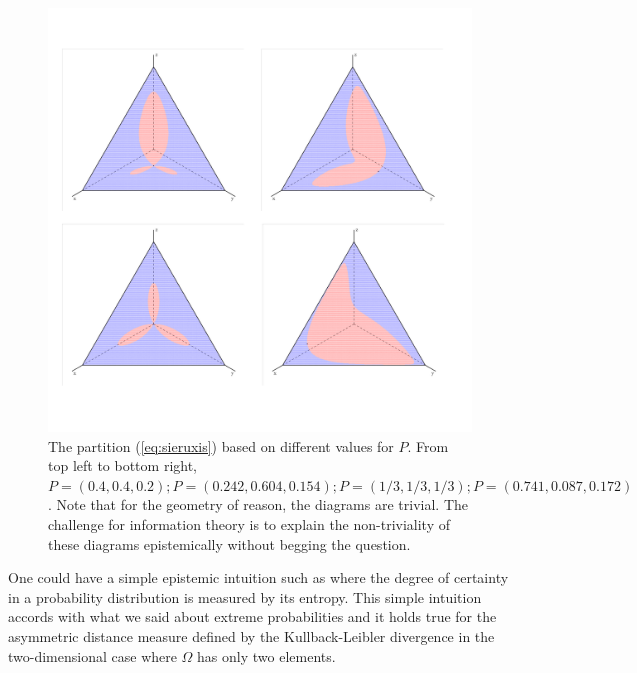 \documentclass[11pt]{article}
\begin{document}
\begin{figure}[ht]
  \begin{flushright}
    \begin{minipage}[h]{\linewidth}
      \includegraphics[width=\textwidth]{concat2.png}
      \caption{\footnotesize The partition (\ref{eq:sieruxis}) based
        on different values for $P$. From top left to bottom right,
        $P=(0.4,0.4,0.2); P=(0.242,0.604,0.154); P=(1/3,1/3,1/3);
        P=(0.741,0.087,0.172)$.
        Note that for the geometry of reason, the diagrams are
        trivial. The challenge for information theory is to explain
        the non-triviality of these diagrams epistemically without
        begging the question.}
      \label{fig:concat}
    \end{minipage}
  \end{flushright}
\end{figure}

One could have a simple epistemic intuition such as 
where the degree of certainty in a probability distribution is
measured by its entropy. This simple intuition accords with what we
said about extreme probabilities and it holds true for the asymmetric
distance measure defined by the Kullback-Leibler divergence in the
two-dimensional case where $\Omega$ has only two elements.
\end{document}
